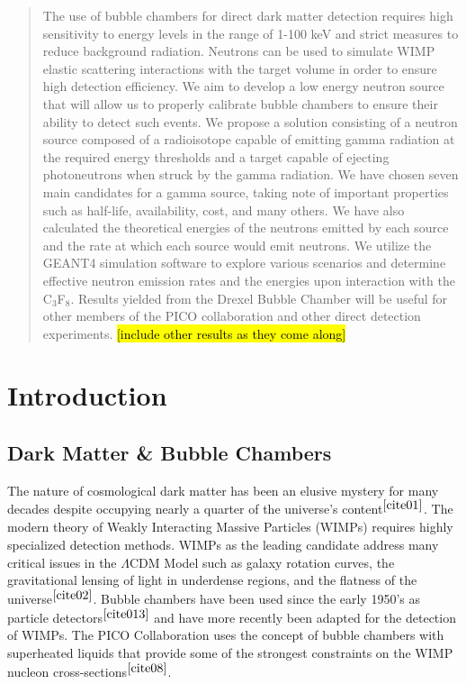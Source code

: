 \documentclass[%
12pt,
twoside,
reprint,
amsmath,amssymb,
aps,
]{article}
\begin{document}
	\begin{abstract}
	\doublespacing
	\par The use of bubble chambers for direct dark matter detection requires high sensitivity to energy levels in the range of 1-100 keV and strict measures to reduce background radiation. Neutrons can be used to simulate WIMP elastic scattering interactions with the target volume in order to ensure high detection efficiency. We aim to develop a low energy neutron source that will allow us to properly calibrate bubble chambers to ensure their ability to detect such events. We propose a solution consisting of a neutron source composed of a radioisotope capable of emitting gamma radiation at the required energy thresholds and a target capable of ejecting photoneutrons when struck by the gamma radiation. We have chosen seven main candidates for a gamma source, taking note of important properties such as half-life, availability, cost, and many others. We have also calculated the theoretical energies of the neutrons emitted by each source and the rate at which each source would emit neutrons. We utilize the GEANT4 simulation software to explore various scenarios and determine effective neutron emission rates and the energies upon interaction with the C$_{3}$F$_{8}$. Results yielded from the Drexel Bubble Chamber will be useful for other members of the PICO collaboration and other direct detection experiments. \hl{[include other results as they come along]}
	\end{abstract}
	
	\section{Introduction}
	\doublespacing
	\subsection{Dark Matter \& Bubble Chambers}
	\par The nature of cosmological dark matter has been an elusive mystery for many decades despite occupying nearly a quarter of the universe's content$^{\cite{cite01}}$. The modern theory of Weakly Interacting Massive Particles (WIMPs) requires highly specialized detection methods. WIMPs as the leading candidate address many critical issues in the $\Lambda$CDM Model such as galaxy rotation curves, the gravitational lensing of light in underdense regions, and the flatness of the universe$^{\cite{cite02}}$. Bubble chambers have been used since the early 1950's as particle detectors$^{\cite{cite013}}$ and have more recently been adapted for the detection of WIMPs. The PICO Collaboration uses the concept of bubble chambers with superheated liquids that provide some of the strongest constraints on the WIMP nucleon cross-sections$^{\cite{cite08}}$.
	
\end{document}
